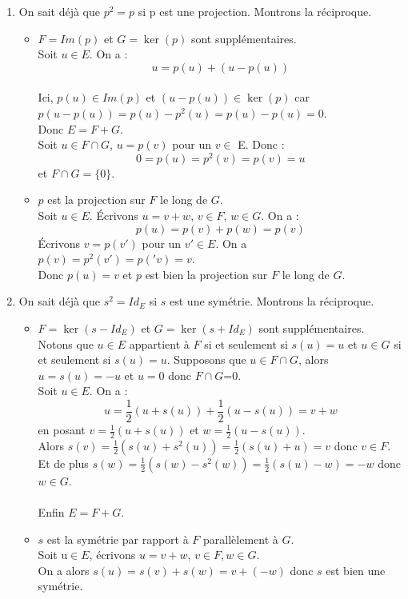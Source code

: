 \documentclass[a4paper,10pt]{book} %
\begin{document}
\begin{enumerate}
\item On sait déjà que $p^2=p$ si p est une projection. Montrons la réciproque.

\begin{itemize}[label=$\bullet$]

\item $F=Im(p)$ et $G=\ker(p)$ sont supplémentaires.\\
Soit $u\in E$. On a :
$$u=p(u)+(u-p(u))$$\\
Ici, $p(u)\in Im(p)$ et $(u-p(u))\in\ker(p)$ car $p(u-p(u))=p(u)-p^2(u)=p(u)-p(u)=0$.\\
Donc $E=F+G$.\\

Soit $u\in F\cap G$, $u=p(v)$ pour un $v\in$ E. Donc :
$$0=p(u)=p^2(v)=p(v)=u$$
et $F\cap G=\{0\}$.\\

\item $p$ est la projection sur $F$ le long de $G$.\\
Soit $u\in E$. Écrivons $u=v+w$, $v\in F$, $w\in G$. On a :
$$p(u)=p(v)+p(w)=p(v)$$
Écrivons $v=p(v')$ pour un $v'\in E$. On a $p(v)=p^2(v')=p('v)=v$.\\
Donc $p(u)=v$ et $p$ est bien la projection sur $F$ le long de $G$.
\end{itemize}

\bigskip\item On sait déjà que $s^2=Id_E$ si $s$ est une symétrie. Montrons la réciproque.

\begin{itemize}[label=$\bullet$]
\item $F=\ker(s-Id_E)$ et $G=\ker(s+Id_E)$ sont supplémentaires.\\

Notons que $u\in E$ appartient à $F$ si et seulement si $s(u)=u$ et $u\in G$ si et seulement si $s(u)=u$. Supposons que $u\in F\cap G$, alors $u=s(u)=-u$ et $u=0$ donc $F\cap G$={0}.\\

Soit $u\in E$. On a :
$$u=\frac{1}{2}(u+s(u))+\frac{1}{2}(u-s(u))=v+w$$
en posant $v=\frac{1}{2}(u+s(u))$ et $w=\frac{1}{2}(u-s(u))$.\\

Alors $s(v)=\frac{1}{2}(s(u)+s^2(u))=\frac{1}{2}(s(u)+u)=v$ donc $v\in F$.\\

Et de plus $s(w)=\frac{1}{2}(s(w)-s^2(w))=\frac{1}{2}(s(u)-w)=-w$ donc $w\in G$.\\\\

Enfin $E=F+G$.\\

\item $s$ est la symétrie par rapport à $F$ parallèlement à $G$.\\

Soit u$\in E$, écrivons $u=v+w$, $v\in F, w\in G$.\\
On a alors $s(u)=s(v)+s(w)=v+(-w)$ donc $s$ est bien une symétrie.
\end{itemize}
\end{enumerate}
\end{document}

